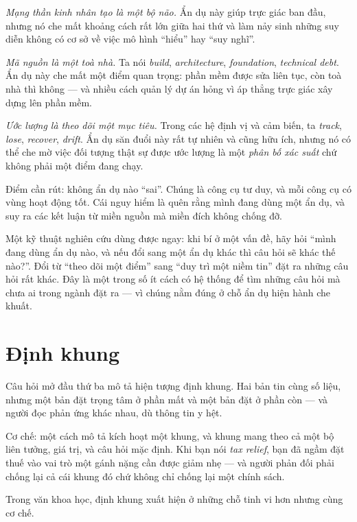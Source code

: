 \documentclass[../../english.tex]{subfiles}
\begin{document}
\emph{Mạng thần kinh nhân tạo là một bộ não.} Ẩn dụ này giúp trực giác ban đầu, nhưng nó che mất khoảng cách rất lớn giữa hai thứ và làm nảy sinh những suy diễn không có cơ sở về việc mô hình ``hiểu'' hay ``suy nghĩ''.

\emph{Mã nguồn là một toà nhà.} Ta nói \emph{build}, \emph{architecture}, \emph{foundation}, \emph{technical debt}. Ẩn dụ này che mất một điểm quan trọng: phần mềm được sửa liên tục, còn toà nhà thì không --- và nhiều cách quản lý dự án hỏng vì áp thẳng trực giác xây dựng lên phần mềm.

\emph{Ước lượng là theo dõi một mục tiêu.} Trong các hệ định vị và cảm biến, ta \emph{track}, \emph{lose}, \emph{recover}, \emph{drift}. Ẩn dụ săn đuổi này rất tự nhiên và cũng hữu ích, nhưng nó có thể che mờ việc đối tượng thật sự được ước lượng là một \emph{phân bố xác suất} chứ không phải một điểm đang chạy.

Điểm cần rút: không ẩn dụ nào ``sai''. Chúng là công cụ tư duy, và mỗi công cụ có vùng hoạt động tốt. Cái nguy hiểm là quên rằng mình đang dùng một ẩn dụ, và suy ra các kết luận từ miền nguồn mà miền đích không chống đỡ.

\begin{cannho}
Một kỹ thuật nghiên cứu dùng được ngay: khi bí ở một vấn đề, hãy hỏi ``mình đang dùng ẩn dụ nào, và nếu đổi sang một ẩn dụ khác thì câu hỏi sẽ khác thế nào?''. Đổi từ ``theo dõi một điểm'' sang ``duy trì một niềm tin'' đặt ra những câu hỏi rất khác. Đây là một trong số ít cách có hệ thống để tìm những câu hỏi mà chưa ai trong ngành đặt ra --- vì chúng nằm đúng ở chỗ ẩn dụ hiện hành che khuất.
\end{cannho}

\section{Định khung}

Câu hỏi mở đầu thứ ba mô tả hiện tượng định khung. Hai bản tin cùng số liệu, nhưng một bản đặt trọng tâm ở phần mất và một bản đặt ở phần còn --- và người đọc phản ứng khác nhau, dù thông tin y hệt.

Cơ chế: một cách mô tả kích hoạt một khung, và khung mang theo cả một bộ liên tưởng, giá trị, và câu hỏi mặc định. Khi bạn nói \emph{tax relief}, bạn đã ngầm đặt thuế vào vai trò một gánh nặng cần được giảm nhẹ --- và người phản đối phải chống lại cả cái khung đó chứ không chỉ chống lại một chính sách.

Trong văn khoa học, định khung xuất hiện ở những chỗ tinh vi hơn nhưng cùng cơ chế.
\end{document}
